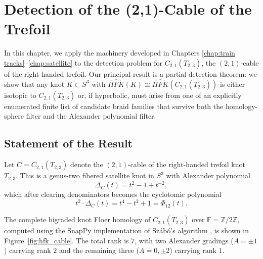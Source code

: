 \chapter{Detection of the (2,1)-Cable of the Trefoil}
\label{chap:cable_detection}

In this chapter, we apply the machinery developed in Chapters \ref{chap:train tracks}--\ref{chap:satellite} to the detection problem for $C_{2,1}(T_{2,3})$, the $(2,1)$-cable of the right-handed trefoil. Our principal result is a partial detection theorem: we show that any knot $K \subset S^3$ with $\widehat{HFK}(K) \cong \widehat{HFK}(C_{2,1}(T_{2,3}))$ is either isotopic to $C_{2,1}(T_{2,3})$ or, if hyperbolic, must arise from one of an explicitly enumerated finite list of candidate braid families that survive both the homology-sphere filter and the Alexander polynomial filter.

\section{Statement of the Result}\label{sec:cable_main_theorem}

Let $C = C_{2,1}(T_{2,3})$ denote the $(2,1)$-cable of the right-handed trefoil knot $T_{2,3}$.  This is a genus-two fibered satellite knot in $S^3$ with Alexander polynomial
\[
\Delta_C(t) = t^2 - 1 + t^{-2},
\]
which after clearing denominators becomes the cyclotomic polynomial
\[
t^2 \cdot \Delta_C(t) = t^4 - t^2 + 1 = \Phi_{12}(t).
\]

The complete bigraded knot Floer homology of $C_{2,1}(T_{2,3})$ over $\mathbb{F} = \mathbb{Z}/2\mathbb{Z}$, computed using the SnapPy implementation of Sz\'{a}b\'{o}'s algorithm \cite{OzsvathSzabo2019}, is shown in Figure~\ref{fig:hfk_cable}. The total rank is $7$, with two Alexander gradings ($A = \pm 1$) carrying rank $2$ and the remaining three ($A = 0, \pm 2$) carrying rank $1$.

